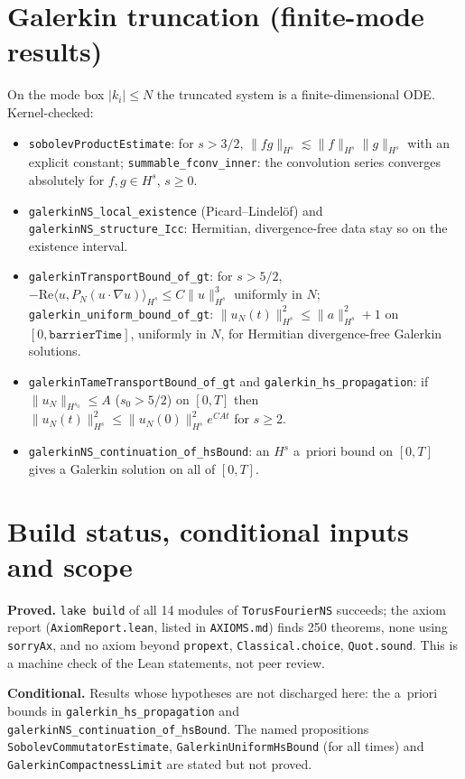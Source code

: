 \documentclass[11pt]{article}
\theoremstyle{remark}\newtheorem*{commentary}{Commentary}
\begin{document}
\section{Galerkin truncation (finite-mode results)}
On the mode box $|k_i|\le N$ the truncated system is a finite-dimensional ODE. Kernel-checked:
\begin{itemize}
\item \texttt{sobolevProductEstimate}: for $s>3/2$, $\|fg\|_{H^s}\lesssim\|f\|_{H^s}\|g\|_{H^s}$ with an explicit constant; \texttt{summable\_fconv\_inner}: the convolution series converges absolutely for $f,g\in H^s$, $s\ge0$.
\item \texttt{galerkinNS\_local\_existence} (Picard--Lindel\"of) and \texttt{galerkinNS\_structure\_Icc}: Hermitian, divergence-free data stay so on the existence interval.
\item \texttt{galerkinTransportBound\_of\_gt}: for $s>5/2$, $-\mathrm{Re}\langle u,P_N(u\cdot\nabla u)\rangle_{H^s}\le C\|u\|_{H^s}^3$ uniformly in $N$; \texttt{galerkin\_uniform\_bound\_of\_gt}: $\|u_N(t)\|_{H^s}^2\le\|a\|_{H^s}^2+1$ on $[0,\texttt{barrierTime}]$, uniformly in $N$, for Hermitian divergence-free Galerkin solutions.
\item \texttt{galerkinTameTransportBound\_of\_gt} and \texttt{galerkin\_hs\_propagation}: if $\|u_N\|_{H^{s_0}}\le A$ ($s_0>5/2$) on $[0,T]$ then $\|u_N(t)\|_{H^s}^2\le\|u_N(0)\|_{H^s}^2e^{CAt}$ for $s\ge2$.
\item \texttt{galerkinNS\_continuation\_of\_hsBound}: an $H^s$ a~priori bound on $[0,T]$ gives a Galerkin solution on all of $[0,T]$.
\end{itemize}

\section{Build status, conditional inputs and scope}
\textbf{Proved.} \texttt{lake build} of all 14 modules of \texttt{TorusFourierNS} succeeds; the axiom
report (\texttt{AxiomReport.lean}, listed in \texttt{AXIOMS.md}) finds 250 theorems, none using
\texttt{sorryAx}, and no axiom beyond \texttt{propext}, \texttt{Classical.choice}, \texttt{Quot.sound}.
This is a machine check of the Lean statements, not peer review.

\textbf{Conditional.} Results whose hypotheses are not discharged here: the a~priori bounds in
\texttt{galerkin\_hs\_propagation} and \texttt{galerkinNS\_continuation\_of\_hsBound}. The named
propositions \texttt{SobolevCommutatorEstimate}, \texttt{GalerkinUniformHsBound} (for all times) and
\texttt{GalerkinCompactnessLimit} are stated but not proved.
\end{document}
